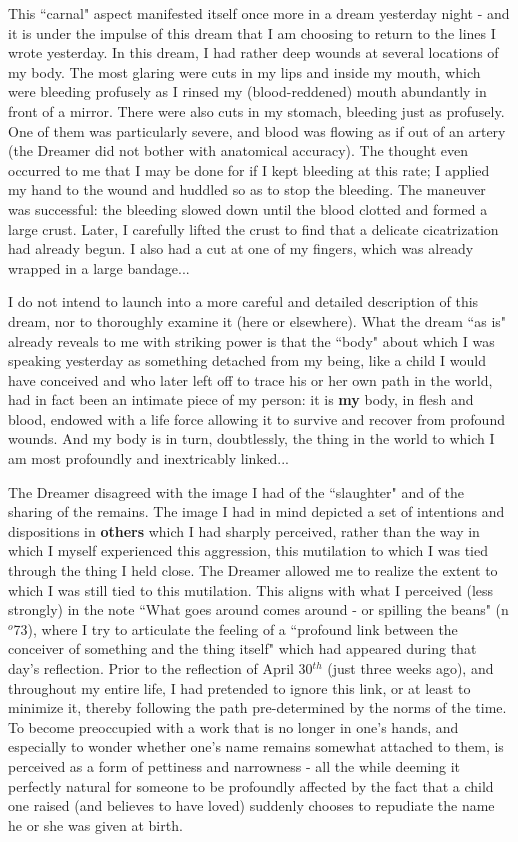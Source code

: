 This ``carnal" aspect manifested itself once more in a dream yesterday night - and it is under the impulse of this dream that I am choosing to return to the lines I wrote yesterday. In this dream, I had rather deep wounds at several locations of my body. The most glaring were cuts in my lips and inside my mouth, which were bleeding profusely as I rinsed my (blood-reddened) mouth abundantly in front of a mirror. There were also cuts in my stomach, bleeding just as profusely. One of them was particularly severe, and blood was flowing as if out of an artery (the Dreamer did not bother with anatomical accuracy). The thought even occurred to me that I may be done for if I kept bleeding at this rate; I applied my hand to the wound and huddled so as to stop the bleeding. The maneuver was successful: the bleeding slowed down until the blood clotted and formed a large crust. Later, I carefully lifted the crust to find that a delicate cicatrization had already begun. I also had a cut at one of my fingers, which was already wrapped in a large bandage...

I do not intend to launch into a more careful and detailed description of this dream, nor to thoroughly examine it (here or elsewhere). What the dream ``as is" already reveals to me with striking power is that the ``body" about which I was speaking yesterday as something detached from my being, like a child I would have conceived and who later left off to trace his or her own path in the world, had in fact been an intimate piece of my person: it is \textbf{my} body, in flesh and blood, endowed with a life force allowing it to survive and recover from profound wounds. And my body is in turn, doubtlessly, the thing in the world to which I am most profoundly and inextricably linked...

The Dreamer disagreed with the image I had of the ``slaughter" and of the sharing of the remains. The image I had in mind depicted a set of intentions and dispositions in \textbf{others} which I had sharply perceived, rather than the way in which I myself experienced this aggression, this mutilation to which I was tied through the thing I held close. The Dreamer allowed me to realize the extent to which I was still tied to this mutilation. This aligns with what I perceived (less strongly) in the note ``What goes around comes around - or spilling the beans" (n$^o$73), where I try to articulate the feeling of a ``profound link between the conceiver of something and the thing itself" which had appeared during that day's reflection. Prior to the reflection of April 30$^{th}$ (just three weeks ago), and throughout my entire life, I had pretended to ignore this link, or at least to minimize it, thereby following the path pre-determined by the norms of the time. To become preoccupied with a work that is no longer in one's hands, and especially to wonder whether one's name remains somewhat attached to them, is perceived as a form of pettiness and narrowness - all the while deeming it perfectly natural for someone to be profoundly affected by the fact that a child one raised (and believes to have loved) suddenly chooses to repudiate the name he or she was given at birth.

